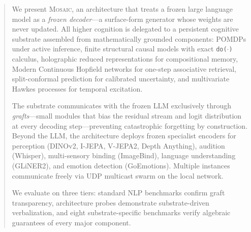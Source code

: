 \begin{abstract}
We present \textsc{Mosaic}, an architecture that treats a frozen large language
model as a \emph{frozen decoder}---a surface-form generator whose weights are
never updated.  All higher cognition is delegated to a persistent cognitive
substrate assembled from mathematically grounded components: POMDPs under active
inference, finite structural causal models with exact \texttt{do($\cdot$)}
calculus, holographic reduced representations for compositional memory, Modern
Continuous Hopfield networks for one-step associative retrieval, split-conformal
prediction for calibrated uncertainty, and multivariate Hawkes processes for
temporal excitation.

The substrate communicates with the frozen LLM exclusively through
\emph{grafts}---small modules that bias the residual stream and logit
distribution at every decoding step---preventing catastrophic forgetting by
construction.  Beyond the LLM, the architecture deploys frozen specialist
encoders for perception (DINOv2, I-JEPA, V-JEPA2, Depth Anything), audition
(Whisper), multi-sensory binding (ImageBind), language understanding (GLiNER2),
and emotion detection (GoEmotions).  Multiple instances communicate freely
via UDP multicast swarm on the local network.

We evaluate on three tiers: standard NLP benchmarks confirm graft transparency,
architecture probes demonstrate substrate-driven verbalization, and eight
substrate-specific benchmarks verify algebraic guarantees of every major
component.
\end{abstract}
